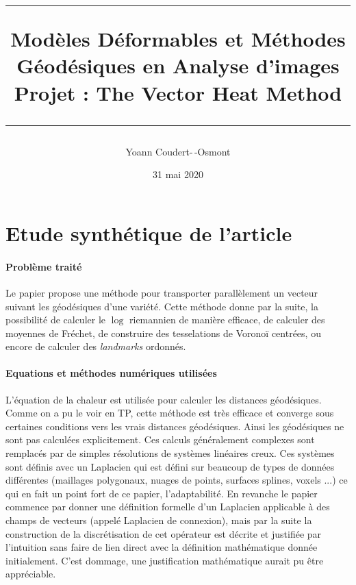 \documentclass[11pt]{article}
\title{
	\noindent\rule{\linewidth}{0.4pt}
	{ \huge Modèles Déformables et Méthodes Géodésiques en Analyse d’images } \\
	Projet : The Vector Heat Method \cite{VHM}
	\noindent\rule{\linewidth}{1pt}
}
\date{31 mai 2020}
\author{Yoann Coudert-\,-Osmont}
\begin{document}
	
	\maketitle
	
	\section{Etude synthétique de l'article}
	
	\paragraph{Problème traité}
	Le papier propose une méthode pour transporter parallèlement un vecteur suivant les géodésiques d'une variété. Cette méthode donne par la suite, la possibilité de calculer le $\log$ riemannien de manière efficace, de calculer des moyennes de Fréchet, de construire des tesselations de Voronoï centrées, ou encore de calculer des \textit{landmarks} ordonnés.
	
	\paragraph{Equations et méthodes numériques utilisées}
	L'équation de la chaleur est utilisée pour calculer les distances géodésiques. Comme on a pu le voir en TP, cette méthode est très efficace et converge sous certaines conditions vers les vrais distances géodésiques. Ainsi les géodésiques ne sont pas calculées explicitement. Ces calculs généralement complexes sont remplacés par de simples résolutions de systèmes linéaires creux. Ces systèmes sont définis avec un Laplacien qui est défini sur beaucoup de types de données différentes (maillages polygonaux, nuages de points, surfaces splines, voxels ...) ce qui en fait un point fort de ce papier, l'adaptabilité. En revanche le papier commence par donner une définition formelle d'un Laplacien applicable à des champs de vecteurs (appelé Laplacien de connexion), mais par la suite la construction de la discrétisation de cet opérateur est décrite et justifiée par l'intuition sans faire de lien direct avec la définition mathématique donnée initialement. C'est dommage, une justification mathématique aurait pu être appréciable.
	
\end{document}
